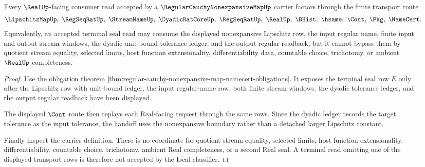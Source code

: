 \begin{theorem}
\label{thm:regular-cauchy-nonexpansive-map-real-handoff}
Every $\RealUp$-facing consumer read accepted by a $\RegularCauchyNonexpansiveMapUp$ carrier factors through the finite transport route
$$
\LipschitzMapUp,\ \RegSeqRatUp,\ \StreamNameUp,\ \DyadicRatCoreUp,\ \RegSeqRatUp,\ \RealUp,\ \BHist,\ \hsame,\ \Cont,\ \Pkg,\ \NameCert .
$$
Equivalently, an accepted terminal seal read may consume the displayed nonexpansive Lipschitz row, the input regular name, finite input and output stream windows, the dyadic unit-bound tolerance ledger, and the output regular readback, but it cannot bypass them by quotient stream equality, selected limits, host function extensionality, differentiability data, countable choice, trichotomy, or ambient $\RealUp$ completeness.
\end{theorem}
\begin{proof}
Use the obligation theorem \autoref{thm:regular-cauchy-nonexpansive-map-namecert-obligations}. It exposes the terminal seal row $E$ only after the Lipschitz row with unit-bound ledger, the input regular-name row, both finite stream windows, the dyadic tolerance ledger, and the output regular readback have been displayed.

The displayed $\Cont$ route then replays each Real-facing request through the same rows. Since the dyadic ledger records the target tolerance as the input tolerance, the handoff uses the nonexpansive boundary rather than a detached larger Lipschitz constant.

Finally inspect the carrier definition. There is no coordinate for quotient stream equality, selected limits, host function extensionality, differentiability, countable choice, trichotomy, ambient Real completeness, or a second Real seal. A terminal read omitting one of the displayed transport rows is therefore not accepted by the local classifier.
\end{proof}


